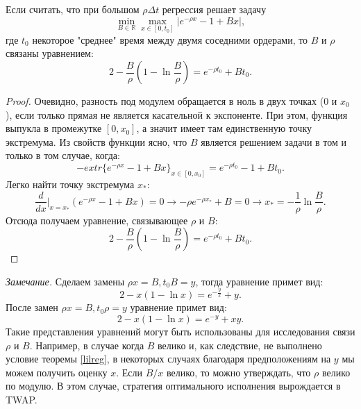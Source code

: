 \begin{appendices}
	\begin{theorem}
		Если считать, что при большом $\rho \Delta t$ регрессия решает задачу
		\begin{equation*}
			\min _{B \in \mathbb{R}} \max _{x \in [0, t_0]} |e^{- \rho x} - 1 + B x|,
		\end{equation*}
		где $t_0$ некоторое "среднее" время между двумя соседними ордерами, то $B$ и $\rho$ связаны уравнением:
		\begin{equation*}
			2 - \frac{B}{\rho}\left(1 - \ln \frac{B}{\rho}\right) = e^{- \rho t_0} + B t_0.
		\end{equation*}
	\end{theorem}
	\begin{proof}
		Очевидно, разность под модулем обращается в ноль в двух точках ($0$ и $x_0$), если только прямая не является касательной к экспоненте.
		При этом, функция выпукла в промежутке $[0, x_0]$, а значит имеет там единственную точку экстремума. Из свойств функции ясно, что $B$
		является решением задачи в том и только в том случае, когда:
		\begin{equation*}
			- extr \{e^{-\rho x} - 1 + B x \}_{x \in [0, x_0]} = e^{-\rho t_0} - 1 + B t_0.
		\end{equation*}
		Легко найти точку экстремума $x_*$:
		\begin{equation*}
			\frac{d}{dx} \Big| _{x=x_*} (e^{-\rho x} - 1 + B x) = 0 \rightarrow -\rho e^{-\rho x_*} + B = 0 \rightarrow x_* = -\frac{1}{\rho} \ln \frac{B}{\rho}.
		\end{equation*}
		Отсюда получаем уравнение, связывающее $\rho$ и $B$:
		\begin{equation*}
			2 - \frac{B}{\rho}\left(1 - \ln \frac{B}{\rho}\right) = e^{- \rho t_0} + B t_0.
		\end{equation*}
	\end{proof}
	\textit{Замечание.} Сделаем замены $\rho x = B, t_0 B = y$, тогда уравнение примет вид:
	\begin{equation*}
		2 - x \left(1 - \ln x\right) = e^{- \frac{y}{x}} + y.
	\end{equation*}
	После замен $\rho x = B, t_0 \rho = y$ уравнение примет вид:
	\begin{equation*}
		2 - x \left(1 - \ln x\right) = e^{- y} + x y.
	\end{equation*}
	Такие представления уравнений могут быть использованы для исследования связи $\rho$ и $B$. Например, в случае когда $B$ велико и,
	как следствие, не выполнено условие теоремы \ref{lilreg}, в некоторых случаях благодаря предположениям на $y$ мы можем получить оценку
	$x$. Если $B / x$ велико, то можно утверждать, что $\rho$ велико по модулю. В этом случае, стратегия оптимального исполнения вырождается в
	TWAP.



\end{appendices}
